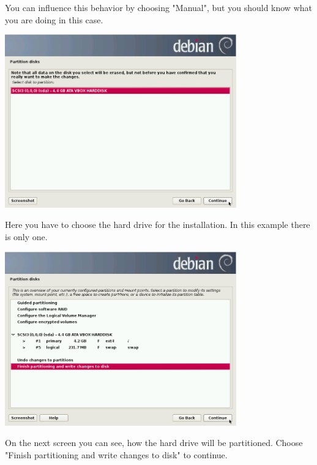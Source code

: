 \documentclass[a4paper,12pt,twoside]{article}
\begin{document}
You can influence this behavior by choosing
"Manual", but you should know what you are
doing in this case.

\bigskip
\begin{minipage}{\linewidth}
    \centering
    \includegraphics[width=10cm]{efaLiveen-img/efaLiveen-img11.png}
    \label{fig:auswahl_festplatte}
\end{minipage}
\bigskip

Here you have to choose the hard drive for the installation. In this
example there is only one.

\bigskip
\begin{minipage}{\linewidth}
    \centering
    \includegraphics[width=10cm]{efaLiveen-img/efaLiveen-img12.png}
    \label{fig:conf_partitioning}
\end{minipage}
\bigskip

On the next screen you can see, how the hard drive will be partitioned.
Choose "Finish partitioning and write changes to disk" to continue.
\end{document}
